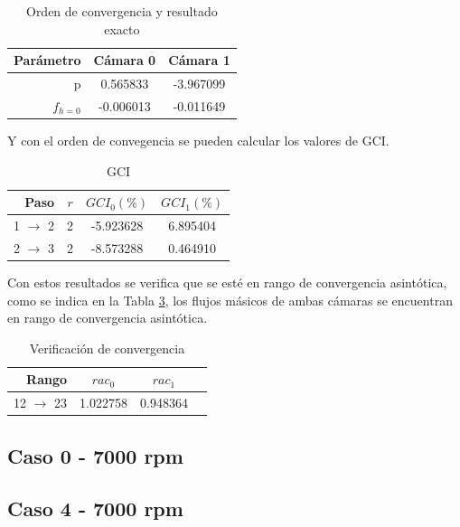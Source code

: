 \documentclass[11pt]{article}
\begin{document}
\begin{table}
    \centering
    \begin{tabular}{rcc}\toprule
        Parámetro & Cámara 0  & Cámara 1  \\ \midrule
        p         &  0.565833 & -3.967099 \\
        $f_{h=0}$ & -0.006013 & -0.011649 \\ \bottomrule
    \end{tabular}
    \caption{Orden de convergencia y resultado exacto}
    \label{tab:res1_caso0}
\end{table}

Y con el orden de convegencia se pueden calcular los valores de GCI.

\begin{table}
    \centering
    \begin{tabular}{rccc}\toprule
        Paso              & $r$ & $GCI_0(\%)$ & $GCI_1(\%)$ \\ \midrule
        1 $\rightarrow$ 2 & 2   & -5.923628   & 6.895404 \\
        2 $\rightarrow$ 3 & 2   & -8.573288   & 0.464910 \\ \bottomrule
    \end{tabular}
    \caption{GCI}
    \label{tab:gci_caso_0}
\end{table}

Con estos resultados se verifica que se esté en rango de convergencia
asintótica, como se indica en la Tabla \ref{tab:rac_caso_0}, los flujos
másicos de ambas cámaras se encuentran en rango de convergencia asintótica.

\begin{table}
    \centering
    \begin{tabular}{rccc}\toprule
        Rango               & $rac_0$  & $rac_1$ \\ \midrule
        12 $\rightarrow$ 23 & 1.022758 & 0.948364 \\ \bottomrule
    \end{tabular}
    \caption{Verificación de convergencia}
    \label{tab:rac_caso_0}
\end{table}


\subsection{Caso 0 - 7000 rpm}

\subsection{Caso 4 - 7000 rpm}
\end{document}
